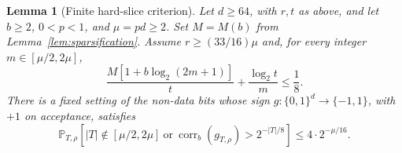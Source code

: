 \documentclass[11pt,letterpaper]{article}
\newtheorem{lemma}[theorem]{Lemma}
\theoremstyle{definition}
\numberwithin{equation}{section}
\newcommand{\Prb}{\mathbb P}
\newcommand{\bits}{\{0,1\}}
\DeclareMathOperator{\corr}{corr}
\begin{document}
\begin{lemma}[Finite hard-slice criterion]\label{lem:slices}
Let $d\ge64$, with $r,t$ as above, and let $b\ge2$, $0<p<1$, and
$\mu=pd\ge2$. Set $M=M(b)$ from Lemma~\ref{lem:sparsification}.
Assume $r\ge(33/16)\mu$ and, for every integer $m\in[\mu/2,2\mu]$,
\begin{equation}\label{eq:union}
 \frac{M[1+b\log_2(2m+1)]}{t}+\frac{\log_2t}{m}\le\frac18.
\end{equation}
There is a fixed setting of the non-data bits whose sign
$g:\bits^d\to\{-1,1\}$, with $+1$ on acceptance, satisfies
\begin{equation}\label{eq:finite-good}
 \Prb_{T,\rho}\!\left[
 |T|\notin[\mu/2,2\mu]\ \text{or}\
 \corr_b(g_{T,\rho})>2^{-|T|/8}\right]
 \le4\cdot2^{-\mu/16}.
\end{equation}
\end{lemma}
\end{document}
